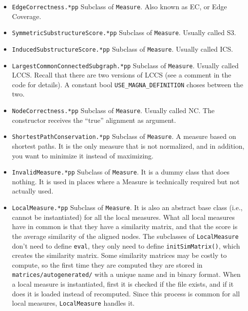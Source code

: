 \documentclass[]{article}
\begin{document}
\begin{itemize}
\item \texttt{EdgeCorrectness.*pp} Subclass of \texttt{Measure}. Also known as EC, or Edge Coverage.

\item \texttt{SymmetricSubstructureScore.*pp} Subclass of \texttt{Measure}. Usually called S3.

\item \texttt{InducedSubstructureScore.*pp} Subclass of \texttt{Measure}. Usually called ICS.

\item \texttt{LargestCommonConnectedSubgraph.*pp} Subclass of \texttt{Measure}. Usually called LCCS. Recall that there are two versions of LCCS (see a comment in the code for details). A constant bool \texttt{USE\_MAGNA\_DEFINITION} choses between the two.

\item \texttt{NodeCorrectness.*pp} Subclass of \texttt{Measure}. Usually called NC. The constructor receives the ``true'' alignment as argument.

\item \texttt{ShortestPathConservation.*pp} Subclass of \texttt{Measure}. A measure based on shortest paths. It is the only measure that is not normalized, and in addition, you want to minimize it instead of maximizing.

\item \texttt{InvalidMeasure.*pp} Subclass of \texttt{Measure}. It is a dummy class that does nothing. It is used in places where a Measure is technically required but not actually used.

\item \texttt{LocalMeasure.*pp} Subclass of \texttt{Measure}. It is also an abstract base class (i.e., cannot be instantiated) for all the local measures. What all local measures have in common is that they have a similarity matrix, and that the score is the average similarity of the aligned nodes. The subclasses of \texttt{LocalMeasure} don't need to define \texttt{eval}, they only need to define \texttt{initSimMatrix()}, which creates the similarity matrix. Some similarity matrices may be costly to compute, so the first time they are computed they are stored in \texttt{matrices/autogenerated/} with a unique name and in binary format. When a local measure is instantiated, first it is checked if the file exists, and if it does it is loaded instead of recomputed. Since this process is common for all local measures, \texttt{LocalMeasure} handles it.


\end{itemize}
\end{document}
